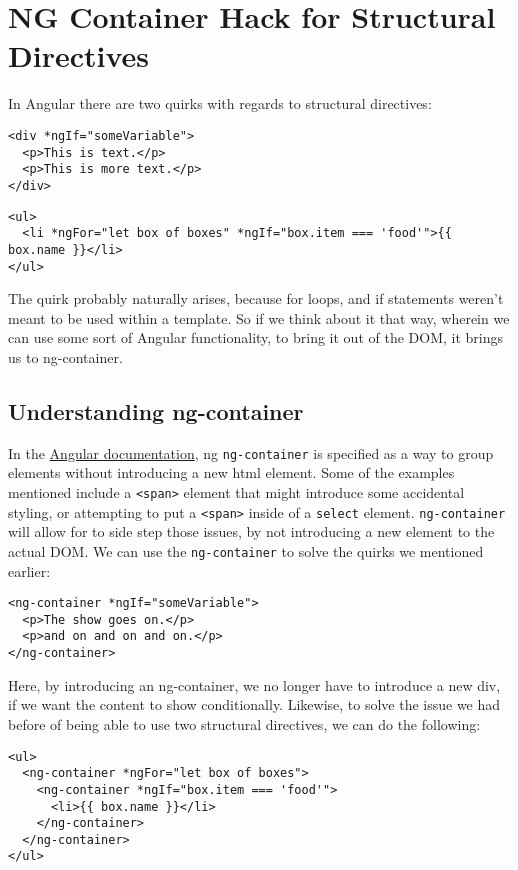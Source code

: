 \chapter{ NG Container Hack for Structural Directives }

In Angular there are two quirks with regards to structural directives:
\begin{lstlisting}[caption=Quirk \#1 - Requiring Extra Element to Implement Structural Directive]
<div *ngIf="someVariable">
  <p>This is text.</p>
  <p>This is more text.</p>
</div>
\end{lstlisting}

\begin{lstlisting}[caption=Quirk \#2 - Inability to apply more than two 
structural directives on the same element]
<ul>
  <li *ngFor="let box of boxes" *ngIf="box.item === 'food'">{{ box.name }}</li>
</ul>
\end{lstlisting}

The quirk probably naturally arises, because for loops, and if statements
weren't meant to be used within a template. So if we think about it that way,
wherein we can use some sort of Angular functionality, to bring it out of the 
DOM, it brings us to ng-container. 

\section{Understanding ng-container}
In the \href{https://angular.io/guide/structural-directives#group-sibling-elements-with-ng-container}{Angular documentation}, ng 
\lstinline{ng-container} is specified as a way to group elements without introducing a new 
html element. Some of the examples mentioned include a \lstinline{<span>} element that 
might introduce some accidental styling, or attempting to put a \lstinline{<span>} inside 
of a \lstinline{select} element. \lstinline{ng-container} will allow for to side step those 
issues, by not introducing a new element to the actual DOM. We can use the 
\lstinline{ng-container} to solve the quirks we mentioned earlier: 

\begin{lstlisting}[caption=Solution to Quirk \#1 - Requiring Extra Element 
  to Implement Structural Directive]
<ng-container *ngIf="someVariable">
  <p>The show goes on.</p>
  <p>and on and on and on.</p>
</ng-container>
\end{lstlisting}

Here, by introducing an ng-container, we no longer have to introduce a new div, 
if we want the content to show conditionally. Likewise, to solve the issue we 
had before of being able to use two structural directives, we can do the 
following: 
\begin{lstlisting}[caption=Solution to Quirk \#2 - Inability to apply more 
  than two structural directives on the same element]
<ul>
  <ng-container *ngFor="let box of boxes">
    <ng-container *ngIf="box.item === 'food'">
      <li>{{ box.name }}</li>
    </ng-container>
  </ng-container>
</ul>  
\end{lstlisting} 

